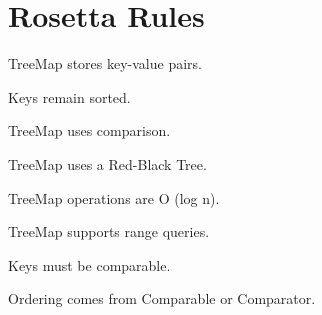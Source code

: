 \documentclass[11pt,a4paper]{book}
\begin{document}
\section{Rosetta Rules}

\begin{rosettarule}

TreeMap stores key-value pairs.

\end{rosettarule}

\begin{rosettarule}

Keys remain sorted.

\end{rosettarule}

\begin{rosettarule}

TreeMap uses comparison.

\end{rosettarule}

\begin{rosettarule}

TreeMap uses a Red-Black Tree.

\end{rosettarule}

\begin{rosettarule}

TreeMap operations are O (log n).

\end{rosettarule}

\begin{rosettarule}

TreeMap supports range queries.

\end{rosettarule}

\begin{rosettarule}

Keys must be comparable.

\end{rosettarule}

\begin{rosettarule}

Ordering comes from
Comparable or Comparator.

\end{rosettarule}
\end{document}
